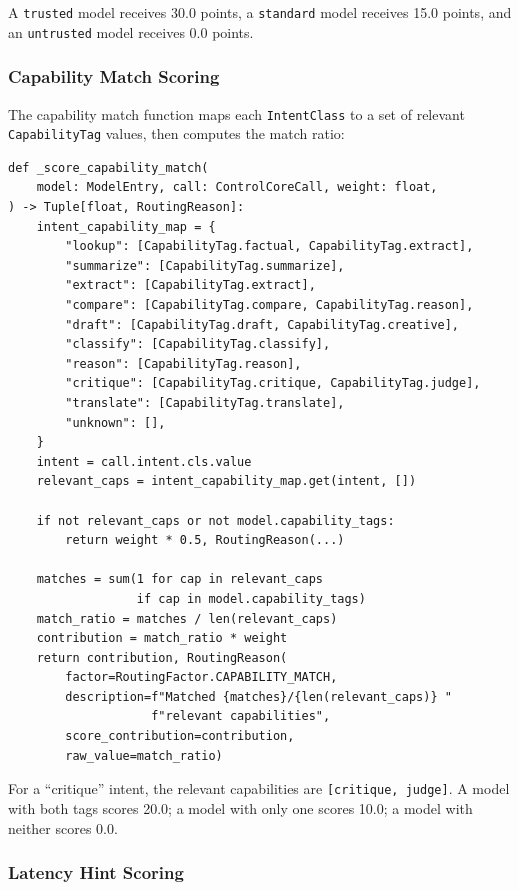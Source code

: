 \documentclass[11pt,a4paper]{article}
\theoremstyle{plain}
\theoremstyle{definition}
\begin{document}
A \texttt{trusted} model receives 30.0 points, a \texttt{standard} model
receives 15.0 points, and an \texttt{untrusted} model receives 0.0 points.

\subsubsection{Capability Match Scoring}

The capability match function maps each \texttt{IntentClass} to a set of
relevant \texttt{CapabilityTag} values, then computes the match ratio:

\begin{lstlisting}[style=pythonstyle, caption={Capability match scoring from \texttt{routing.py}}]
def _score_capability_match(
    model: ModelEntry, call: ControlCoreCall, weight: float,
) -> Tuple[float, RoutingReason]:
    intent_capability_map = {
        "lookup": [CapabilityTag.factual, CapabilityTag.extract],
        "summarize": [CapabilityTag.summarize],
        "extract": [CapabilityTag.extract],
        "compare": [CapabilityTag.compare, CapabilityTag.reason],
        "draft": [CapabilityTag.draft, CapabilityTag.creative],
        "classify": [CapabilityTag.classify],
        "reason": [CapabilityTag.reason],
        "critique": [CapabilityTag.critique, CapabilityTag.judge],
        "translate": [CapabilityTag.translate],
        "unknown": [],
    }
    intent = call.intent.cls.value
    relevant_caps = intent_capability_map.get(intent, [])

    if not relevant_caps or not model.capability_tags:
        return weight * 0.5, RoutingReason(...)

    matches = sum(1 for cap in relevant_caps
                  if cap in model.capability_tags)
    match_ratio = matches / len(relevant_caps)
    contribution = match_ratio * weight
    return contribution, RoutingReason(
        factor=RoutingFactor.CAPABILITY_MATCH,
        description=f"Matched {matches}/{len(relevant_caps)} "
                    f"relevant capabilities",
        score_contribution=contribution,
        raw_value=match_ratio)
\end{lstlisting}

For a ``critique'' intent, the relevant capabilities are
\texttt{[critique, judge]}. A model with both tags scores 20.0; a model with
only one scores 10.0; a model with neither scores 0.0.

\subsubsection{Latency Hint Scoring}
\end{document}
